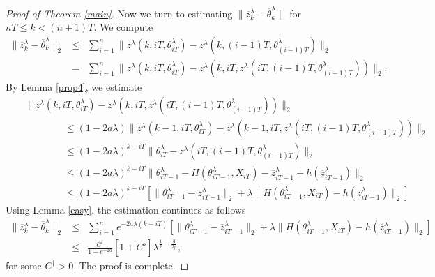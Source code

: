 \documentclass[a4paper]{article}
\begin{document}
\begin{proof}[ Proof of Theorem \ref{main}]
Now we turn to
estimating $\|\overline{z}_k^{\lambda}-\overline{\theta}^{\lambda}_k\|$ for $nT \le k < (n+1)T$. We compute 
\begin{eqnarray*}
	\|\overline{z}_k^{\lambda}-\overline{\theta}^{\lambda}_k\|_2 &\leq &
	\sum_{i=1}^n \|z^{\lambda}(k,iT,\theta^{\lambda}_{iT}) - z^{\lambda}(k, (i-1)T, \theta^{\lambda}_{(i-1)T})\|_2  \\
	&=& \sum_{i=1}^n \|z^{\lambda}(k,iT,\theta^{\lambda}_{iT}) - z^{\lambda}(k, iT, z^{\lambda}(iT,(i-1)T, \theta^{\lambda}_{(i-1)T}))\|_2.
\end{eqnarray*}
By Lemma \ref{prop4}, we estimate
\begin{eqnarray*}
&&\|z^{\lambda}(k,iT,\theta^{\lambda}_{iT}) - z^{\lambda}(k, iT, z^{\lambda}(iT,(i-1)T, \theta^{\lambda}_{(i-1)T}))\|_2  \\
&& \qquad\qquad \leq (1 - 2 a \lambda) \| z^{\lambda}(k-1,iT,\theta^{\lambda}_{iT}) - z^{\lambda}(k-1, iT, z^{\lambda}(iT,(i-1)T, \theta^{\lambda}_{(i-1)T}))  \|_2\\
&& \qquad \qquad \leq (1 - 2 a \lambda)^{k - iT} \|  \theta^{\lambda}_{iT} - z^{\lambda}(iT,(i-1)T, \theta^{\lambda}_{(i-1)T}) \|_2 \\
&& \qquad\qquad \leq (1 - 2 a \lambda)^{k - iT} \|  \theta^{\lambda}_{iT-1} - H(\theta^{\lambda}_{iT-1}, X_{iT}) - \overline{z}^{\lambda}_{iT-1} + h(\overline{z}^{\lambda}_{iT-1}) \|_2\\
&& \qquad\qquad \leq (1 - 2 a \lambda)^{k - iT}\left[ \| \theta^{\lambda}_{iT-1} - \overline{z}^{\lambda}_{iT-1}  \|_2 + \lambda \|H(\theta^{\lambda}_{iT-1}, X_{iT}) - h(\overline{z}^{\lambda}_{iT-1}) \|_2 \right]
\end{eqnarray*}
Using Lemma \ref{easy}, the estimation continues as follows
\begin{eqnarray*}
\|\overline{z}_k^{\lambda}-\overline{\theta}^{\lambda}_k\|_2 &\leq & \sum_{i = 1}^{n} e^{-2a\lambda(k-iT)}
	\left[\|\theta^{\lambda}_{iT -1} - \overline{z}^{\lambda}_{iT-1}\|_2 +
	\lambda \|H(\theta^{\lambda}_{iT-1},X_{iT}) - h(\overline{z}^{\lambda}_{iT-1})\|_2\right]\\
	&\leq & \frac{C^{\dagger}}{1-e^{-2a}}\left[1+C^{\flat}\right]\lambda^{\frac{1}{2} - \frac{3}{2p}},
\end{eqnarray*}
for some $C^{\dagger}>0$. The proof is complete.
\end{proof}
\end{document}
